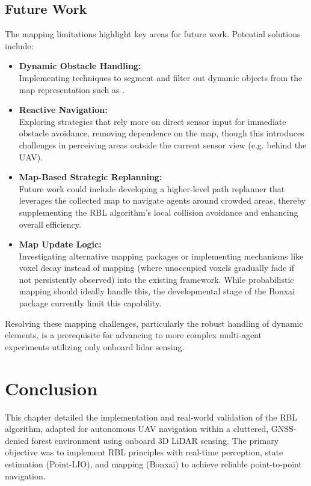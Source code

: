             \subsection{Future Work}
                The mapping limitations highlight key areas for future work. Potential solutions include:
                \begin{itemize}
                    \item \textbf{Dynamic Obstacle Handling: }\\
                    Implementing techniques to segment and filter out dynamic objects from the map representation such as \cite{TRLO_good_mapping}.
                    \item \textbf{Reactive Navigation: }\\
                    Exploring strategies that rely more on direct sensor input for immediate obstacle avoidance, removing dependence on the map, though this introduces challenges in perceiving areas outside the current sensor view (e.g. behind the UAV).
                    \item \textbf{Map-Based Strategic Replanning:} \\
                    Future work could include developing a higher-level path replanner that leverages the collected map to navigate agents around crowded areas, thereby supplementing the \ac{RBL} algorithm's local collision avoidance and enhancing overall efficiency.
                    \item \textbf{Map Update Logic: }\\
                    Investigating alternative mapping packages or implementing mechanisms like voxel decay instead of mapping (where unoccupied voxels gradually fade if not persistently observed) into the existing framework. 
                    While probabilistic mapping should ideally handle this, the developmental stage of the Bonxai package currently limit this capability.
                \end{itemize}
                Resolving these mapping challenges, particularly the robust handling of dynamic elements, is a prerequisite for advancing to more complex multi-agent experiments utilizing only onboard lidar sensing.
    
    \section{Conclusion}
    \label{sec:conclusion_lidar}
        This chapter detailed the implementation and real-world validation of the \ac{RBL} algorithm, adapted for autonomous \ac{UAV} navigation within a cluttered, \ac{GNSS}-denied forest environment using onboard 3D \ac{LiDAR} sensing. 
        The primary objective was to implement \ac{RBL} principles with real-time perception, state estimation (\ac{Point-LIO}), and mapping (Bonxai) to achieve reliable point-to-point navigation.

